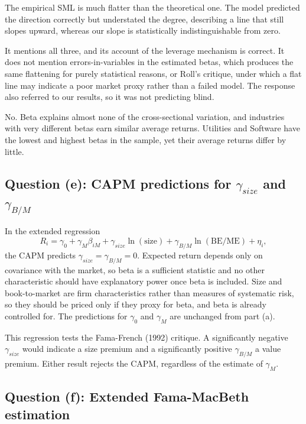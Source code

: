 \begin{tight}
\item[(i)] The empirical SML is much flatter than the theoretical one. The
model predicted the direction correctly but understated the degree, describing
a line that still slopes upward, whereas our slope is statistically
indistinguishable from zero.
\item[(ii)] It mentions all three, and its account of the leverage mechanism
is correct. It does not mention errors-in-variables in the estimated betas,
which produces the same flattening for purely statistical reasons, or Roll's
critique, under which a flat line may indicate a poor market proxy rather than
a failed model. The response also referred to our results, so it was not
predicting blind.
\item[(iii)] No. Beta explains almost none of the cross-sectional variation,
and industries with very different betas earn similar average returns.
Utilities and Software have the lowest and highest betas in the sample, yet
their average returns differ by little.
\end{tight}

\subsection{Question (e): CAPM predictions for $\gamma_{size}$ and $\gamma_{B/M}$}

In the extended regression
\[
R_i = \gamma_0 + \gamma_M \beta_{iM} + \gamma_{size}\ln(\text{size})
+ \gamma_{B/M}\ln(\text{BE/ME}) + \eta_i ,
\]
the CAPM predicts $\gamma_{size} = \gamma_{B/M} = 0$. Expected return depends
only on covariance with the market, so beta is a sufficient statistic and no
other characteristic should have explanatory power once beta is included. Size
and book-to-market are firm characteristics rather than measures of systematic
risk, so they should be priced only if they proxy for beta, and beta is already
controlled for. The predictions for $\gamma_0$ and $\gamma_M$ are unchanged
from part (a).

This regression tests the Fama-French (1992) critique. A significantly negative
$\gamma_{size}$ would indicate a size premium and a significantly positive
$\gamma_{B/M}$ a value premium. Either result rejects the CAPM, regardless of
the estimate of $\gamma_M$.

\subsection{Question (f): Extended Fama-MacBeth estimation}

